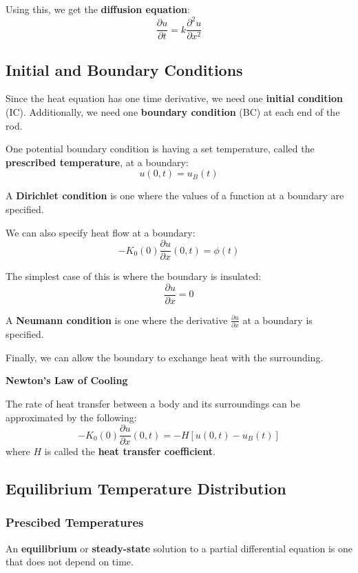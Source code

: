 \documentclass{article}
\begin{document}
Using this, we get the \textbf{diffusion equation}:
\[
    \frac{\partial u}{\partial t}=k\frac{\partial ^2 u}{\partial x^2}
\]

\subsection{Initial and Boundary Conditions}

Since the heat equation has one time derivative, we need one \textbf{initial condition} (IC). Additionally, we need one \textbf{boundary condition} (BC) at each end of the rod.

One potential boundary condition is having a set temperature, called the \textbf{prescribed temperature}, at a boundary:
\[
    u(0, t)=u_B(t)
\]

\begin{definition}
    A \textbf{Dirichlet condition} is one where the values of a function at a boundary are specified. 
\end{definition}

We can also specify heat flow at a boundary:
\[
    -K_0(0)\frac{\partial u}{\partial x}(0,t)=\phi (t)
\]

The simplest case of this is where the boundary is insulated:
\[
    \frac{\partial u}{\partial x}=0
\]

\begin{definition}
    A \textbf{Neumann condition} is one where the derivative \(\frac{\partial u}{\partial x}\) at a boundary is specified. 
\end{definition}

Finally, we can allow the boundary to exchange heat with the surrounding.

\begin{theorem}{\textbf{Newton's Law of Cooling}}
    $ $
    
    The rate of heat transfer between a body and its surroundings can be approximated by the following:
    \[
        -K_0(0)\frac{\partial u}{\partial x}(0,t)=-H[u(0,t)-u_B(t)]
    \]
    where \(H\) is called the \textbf{heat transfer coefficient}. 
\end{theorem}

\subsection{Equilibrium Temperature Distribution}
\subsubsection{Prescibed Temperatures}
\begin{definition}
    An \textbf{equilibrium} or \textbf{steady-state} solution to a partial differential equation is one that does not depend on time.
\end{definition}
\end{document}
